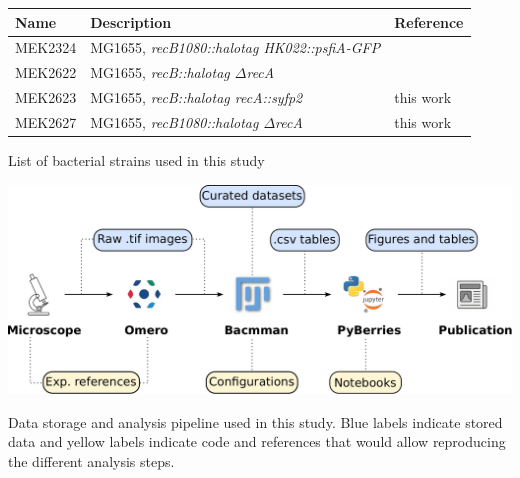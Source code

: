 \clearpage

\setlength\intextsep{40pt}


\begin{supptable}[htbp]
    \centering
    \begin{tabular}{lll}
        \toprule
        Name & Description & Reference\\
        \midrule
        MEK2324 & MG1655, \textit{recB1080::halotag HK022::psfiA-GFP} & \\ %
        MEK2622 & MG1655, \textit{recB::halotag $\Delta$recA} & \\ %
        MEK2623 & MG1655, \textit{recB::halotag recA::syfp2} & this work\\
        MEK2627 & MG1655, \textit{recB1080::halotag $\Delta$recA} & this work \\
         \bottomrule
    \end{tabular}
    \caption{List of bacterial strains used in this study}
    \label{SItab:strains}
\end{supptable}

\begin{suppfigure*}[htbp]
\begin{center}
\includegraphics[width=\textwidth]{SI_Figures/Data_analysis_workflow.pdf}
\end{center}
\caption{Data storage and analysis pipeline used in this study. Blue labels indicate stored data and yellow labels indicate code and references that would allow reproducing the different analysis steps.}
\label{SIFig:analysis_workflow}
\end{suppfigure*}


